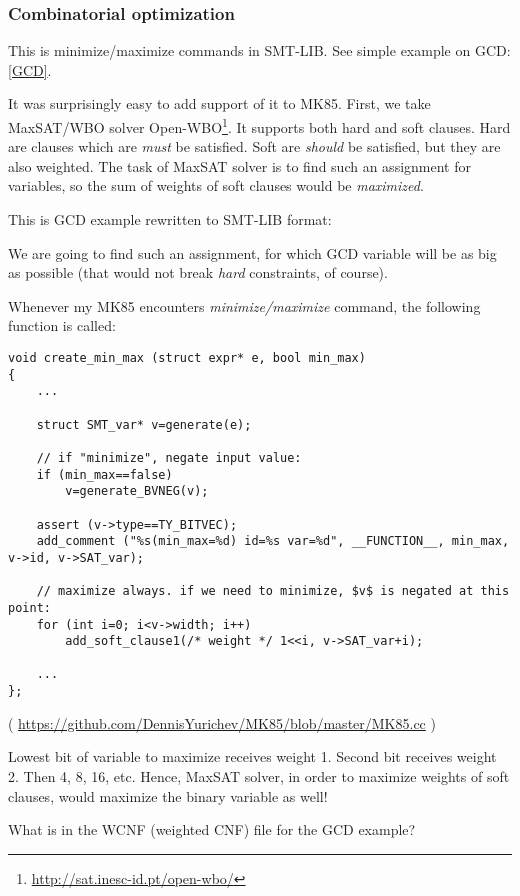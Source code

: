 \subsubsection{Combinatorial optimization}

This is minimize/maximize commands in SMT-LIB.
See simple example on \ac{GCD}: \ref{GCD}.

It was surprisingly easy to add support of it to MK85.
First, we take MaxSAT/WBO solver Open-WBO\footnote{\url{http://sat.inesc-id.pt/open-wbo/}}.
It supports both hard and soft clauses.
Hard are clauses which are \textit{must} be satisfied.
Soft are \textit{should} be satisfied, but they are also weighted.
The task of MaxSAT solver is to find such an assignment for variables, so the sum of weights of soft clauses would be
\textit{maximized}.

This is GCD example rewritten to SMT-LIB format:



We are going to find such an assignment, for which GCD variable will be as big as possible
(that would not break \textit{hard} constraints, of course).

Whenever my MK85 encounters \textit{minimize/maximize} command, the following function is called:

\begin{lstlisting}[style=customc]
void create_min_max (struct expr* e, bool min_max)
{
	...

	struct SMT_var* v=generate(e);

	// if "minimize", negate input value:
	if (min_max==false)
		v=generate_BVNEG(v);

	assert (v->type==TY_BITVEC);
	add_comment ("%s(min_max=%d) id=%s var=%d", __FUNCTION__, min_max, v->id, v->SAT_var);

	// maximize always. if we need to minimize, $v$ is negated at this point:
	for (int i=0; i<v->width; i++)
		add_soft_clause1(/* weight */ 1<<i, v->SAT_var+i);

	...
};
\end{lstlisting}

( \url{https://github.com/DennisYurichev/MK85/blob/master/MK85.cc} )

Lowest bit of variable to maximize receives weight 1.
Second bit receives weight 2.
Then 4, 8, 16, etc.
Hence, MaxSAT solver, in order to maximize weights of soft clauses, would maximize the binary variable as well!

What is in the WCNF (weighted CNF) file for the GCD example?

